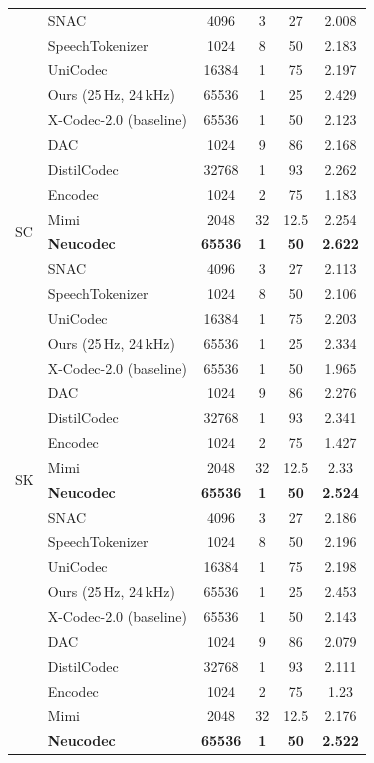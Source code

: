 \documentclass[preprint]{article}
\begin{document}
\begin{longtable}{llcccc}
  & SNAC & 4096 & 3 & 27 & 2.008 \\
  & SpeechTokenizer & 1024 & 8 & 50 & 2.183 \\
  & UniCodec & 16384 & 1 & 75 & 2.197 \\
  & Ours (25\,Hz, 24\,kHz) & 65536 & 1 & 25 & 2.429 \\
  & X-Codec-2.0 (baseline) & 65536 & 1 & 50 & 2.123 \\
\midrule
\multirow{8}{*}{SC}
  & DAC & 1024 & 9 & 86 & 2.168 \\
  & DistilCodec & 32768 & 1 & 93 & 2.262 \\
  & Encodec & 1024 & 2 & 75 & 1.183 \\
  & Mimi & 2048 & 32 & 12.5 & 2.254 \\
  & \textbf{Neucodec} & \textbf{65536} & \textbf{1} & \textbf{50} & \textbf{2.622} \\
  & SNAC & 4096 & 3 & 27 & 2.113 \\
  & SpeechTokenizer & 1024 & 8 & 50 & 2.106 \\
  & UniCodec & 16384 & 1 & 75 & 2.203 \\
  & Ours (25\,Hz, 24\,kHz) & 65536 & 1 & 25 & 2.334 \\
  & X-Codec-2.0 (baseline) & 65536 & 1 & 50 & 1.965 \\
\midrule
\multirow{8}{*}{SK}
  & DAC & 1024 & 9 & 86 & 2.276 \\
  & DistilCodec & 32768 & 1 & 93 & 2.341 \\
  & Encodec & 1024 & 2 & 75 & 1.427 \\
  & Mimi & 2048 & 32 & 12.5 & 2.33 \\
  & \textbf{Neucodec} & \textbf{65536} & \textbf{1} & \textbf{50} & \textbf{2.524} \\
  & SNAC & 4096 & 3 & 27 & 2.186 \\
  & SpeechTokenizer & 1024 & 8 & 50 & 2.196 \\
  & UniCodec & 16384 & 1 & 75 & 2.198 \\
  & Ours (25\,Hz, 24\,kHz) & 65536 & 1 & 25 & 2.453 \\
  & X-Codec-2.0 (baseline) & 65536 & 1 & 50 & 2.143 \\
\newpage
\multirow{8}{*}{SKR}
  & DAC & 1024 & 9 & 86 & 2.079 \\
  & DistilCodec & 32768 & 1 & 93 & 2.111 \\
  & Encodec & 1024 & 2 & 75 & 1.23 \\
  & Mimi & 2048 & 32 & 12.5 & 2.176 \\
  & \textbf{Neucodec} & \textbf{65536} & \textbf{1} & \textbf{50} & \textbf{2.522} \\

\end{longtable}
\end{document}
